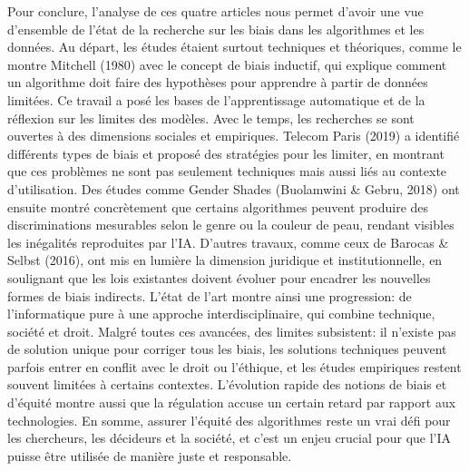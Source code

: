 \documentclass{article}
\begin{document}
Pour conclure, l’analyse de ces quatre articles nous permet d’avoir une vue d’ensemble de l’état de la recherche sur les biais dans les algorithmes et les données. Au départ, les études étaient surtout techniques et théoriques, comme le montre Mitchell (1980) avec le concept de biais inductif, qui explique comment un algorithme doit faire des hypothèses pour apprendre à partir de données limitées. Ce travail a posé les bases de l’apprentissage automatique et de la réflexion sur les limites des modèles. Avec le temps, les recherches se sont ouvertes à des dimensions sociales et empiriques. Telecom Paris (2019) a identifié différents types de biais et proposé des stratégies pour les limiter, en montrant que ces problèmes ne sont pas seulement techniques mais aussi liés au contexte d’utilisation. Des études comme Gender Shades (Buolamwini \& Gebru, 2018) ont ensuite montré concrètement que certains algorithmes peuvent produire des discriminations mesurables selon le genre ou la couleur de peau, rendant visibles les inégalités reproduites par l’IA. D’autres travaux, comme ceux de Barocas \& Selbst (2016), ont mis en lumière la dimension juridique et institutionnelle, en soulignant que les lois existantes doivent évoluer pour encadrer les nouvelles formes de biais indirects. L’état de l’art montre ainsi une progression: de l’informatique pure à une approche interdisciplinaire, qui combine technique, société et droit.	Malgré toutes ces avancées, des limites subsistent: il n’existe pas de solution unique pour corriger tous les biais, les solutions techniques peuvent parfois entrer en conflit avec le droit ou l’éthique, et les études empiriques restent souvent limitées à certains contextes. L’évolution rapide des notions de biais et d’équité montre aussi que la régulation accuse un certain retard par rapport aux technologies.	En somme, assurer l’équité des algorithmes reste un vrai défi pour les chercheurs, les décideurs et la société, et c’est un enjeu crucial pour que l’IA puisse être utilisée de manière juste et responsable.\\[1em]








\nocite{*}


\end{document}
